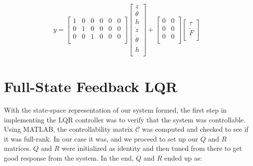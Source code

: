\documentclass[dvips,12pt]{article}
\begin{document}
{\begin{gather}
 y
 =
 \begin{bmatrix}
     1 & 0 & 0 & 0 & 0 & 0\\
     0 & 1 & 0 & 0 & 0 & 0\\
     0 & 0 & 1 & 0 & 0 & 0\\
   \end{bmatrix}
      \begin{bmatrix}
           z \\
           \theta\\
           h \\
           \dot{z} \\
           \dot{\theta} \\
           \dot{h} \\
         \end{bmatrix}
         +
		 \begin{bmatrix}
		            0 & 0 \\
		            0 & 0 \\
		            0 & 0 \\
		          \end{bmatrix}
		          \begin{bmatrix}
		                         \tau \\
		                         \tilde{F} \\
		                     \end{bmatrix}      
\end{gather}}

\section{Full-State Feedback LQR}

With the state-space representation of our system formed, the first step in implementing the LQR controller was to verify that the system was controllable.  Using MATLAB, the controllability matrix $ \mathcal{C} $ was computed and checked to see if it was full-rank.  In our case it was, and we proceed to set up our $Q$ and $R$ matrices.  $Q$ and $R$ were initialized as identity and then tuned from there to get good response from the system.  In the end, $Q$ and $R$ ended up as:
\end{document}
